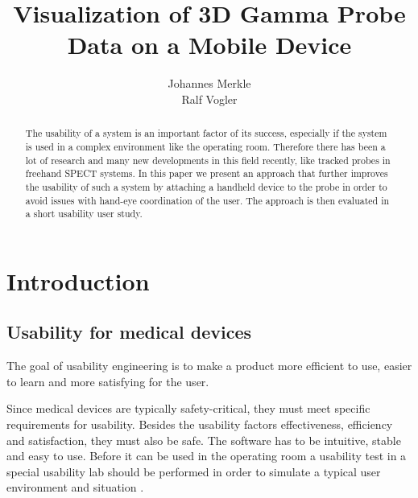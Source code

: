 \documentclass{scrartcl}
\title{Visualization of 3D Gamma Probe Data on a Mobile Device}
\author{Johannes Merkle \\ Ralf Vogler}
\newcommand{\red}[1]{{\color{red} #1}}
\newcommand{\graphic}[3][width=\linewidth] %
{
  \begin{figure}[h!t]
    \centering
    \texttt{[image: img/\#2]}
    \caption{#3}
    \label{fig:#2}
  \end{figure}
}
\newcommand{\refFigure}[1]{figure \ref{fig:#1}}
\begin{document}
\maketitle


\begin{abstract}
The usability of a system is an important factor of its success, especially if the system is used in a complex environment like the operating room. Therefore there has been a lot of research and many new developments in this field recently, like tracked probes in freehand SPECT systems. In this paper we present an approach that further improves the usability of such a system by attaching a handheld device to the probe in order to avoid issues with hand-eye coordination of the user. The approach is then evaluated in a short usability user study.
\end{abstract}



\section{Introduction}


\subsection{Usability for medical devices}
The goal of usability engineering is to make a product more efficient to use, easier to learn and more satisfying for the user.

Since medical devices are typically safety-critical, they must meet specific requirements for usability. Besides the usability factors effectiveness, efficiency and satisfaction, they must also be safe. The software has to be intuitive, stable and easy to use. Before it can be used in the operating room a usability test in a special usability lab should be performed in order to simulate a typical user environment and situation \cite{bigdelou}.


\end{document}
